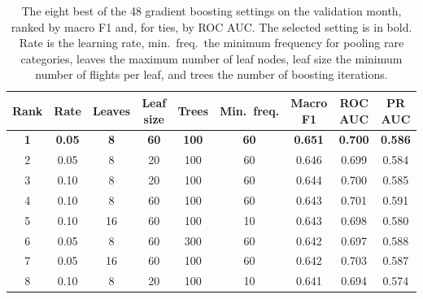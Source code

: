 \begin{table}[H]
  \centering
  \caption{The eight best of the 48 gradient boosting settings on the validation month, ranked by macro F1 and, for ties, by ROC AUC. The selected setting is in bold. Rate is the learning rate, min.\ freq.\ the minimum frequency for pooling rare categories, leaves the maximum number of leaf nodes, leaf size the minimum number of flights per leaf, and trees the number of boosting iterations.}
  \label{tab:val_grid_gb}
  \footnotesize
  \setlength{\tabcolsep}{3pt}
  \begin{tabular*}{\textwidth}{@{\extracolsep{\fill}}ccccccccc@{}}
    \toprule
    Rank & Rate & Leaves & Leaf size & Trees & Min.\ freq. & Macro F1 & ROC AUC & PR AUC \\
    \midrule
    \textbf{1} & \textbf{0.05} & \textbf{8} & \textbf{60} & \textbf{100} & \textbf{60} & \textbf{0.651} & \textbf{0.700} & \textbf{0.586} \\
    2 & 0.05 & 8 & 20 & 100 & 60 & 0.646 & 0.699 & 0.584 \\
    3 & 0.10 & 8 & 20 & 100 & 60 & 0.644 & 0.700 & 0.585 \\
    4 & 0.10 & 8 & 60 & 100 & 60 & 0.643 & 0.701 & 0.591 \\
    5 & 0.10 & 16 & 60 & 100 & 10 & 0.643 & 0.698 & 0.580 \\
    6 & 0.05 & 8 & 60 & 300 & 60 & 0.642 & 0.697 & 0.588 \\
    7 & 0.05 & 16 & 60 & 100 & 60 & 0.642 & 0.703 & 0.587 \\
    8 & 0.10 & 8 & 20 & 100 & 10 & 0.641 & 0.694 & 0.574 \\
    \bottomrule
  \end{tabular*}
\end{table}
